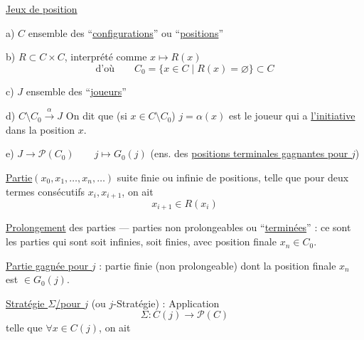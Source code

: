 \uline{Jeux de position}

a) $C$ ensemble des ``\uline{configurations}'' ou ``\uline{positions}''

b) $R\subset C\times C$, interprété comme $x\longmapsto R(x)$
\[
\text{d'où}\qquad C_0=\{x\in C\mid R(x)=\varnothing\}\subset C
\]

c) $J$ ensemble des ``\uline{joueurs}''

d) $C\setminus C_0\xrightarrow{\alpha}J$ On dit que (si $x\in C\setminus C_0$) $j=\alpha(x)$ est le joueur qui a \uline{l'initiative} dans la position $x$.
\inserted{\[
C(j)=\{x\in C\setminus C_0\mid\alpha(x)=j\}\qquad
\bar C(j)=(C\setminus C_0)\setminus C(j)
\]}

e) $J\longrightarrow\mathcal P(C_0)\qquad j\longmapsto G_0(j)$ (ens. des \uline{positions terminales gagnantes pour $j$})

\uline{Partie}\quad $(x_0,x_1,\ldots,x_n,\ldots)$ suite finie ou infinie de positions, telle que pour deux termes consécutifs $x_i,x_{i+1}$, on ait
\[
x_{i+1}\in R(x_i)
\]

\uline{Prolongement} des parties --- parties non prolongeables ou ``\uline{terminées}'' : ce sont les parties qui sont soit infinies, soit finies, avec   position finale $x_n\in C_0$.

\uline{Partie gagnée pour $j$} : partie finie (non prolongeable) dont la position finale $x_n$ est $\in G_0(j)$.

\uline{Stratégie $\Sigma$/pour $j$} (ou $j$-Stratégie) : Application
\[
\Sigma:C(j)\longrightarrow\mathcal P(C)
\]
telle que $\forall x\in C(j)$, on ait
